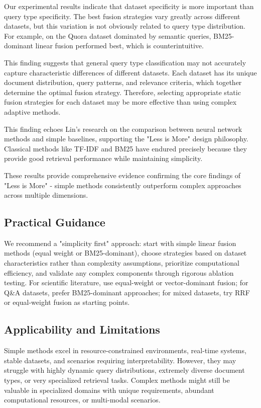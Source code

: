 \documentclass[letterpaper]{article} %
\begin{document}
Our experimental results indicate that dataset specificity is more important than query type specificity. The best fusion strategies vary greatly across different datasets, but this variation is not obviously related to query type distribution. For example, on the Quora dataset dominated by semantic queries, BM25-dominant linear fusion performed best, which is counterintuitive.

This finding suggests that general query type classification may not accurately capture characteristic differences of different datasets. Each dataset has its unique document distribution, query patterns, and relevance criteria, which together determine the optimal fusion strategy. Therefore, selecting appropriate static fusion strategies for each dataset may be more effective than using complex adaptive methods.

This finding echoes Lin's research \cite{lin2019neural} on the comparison between neural network methods and simple baselines, supporting the "Less is More" design philosophy. Classical methods like TF-IDF \cite{salton1988term} and BM25 \cite{robertson2009probabilistic} have endured precisely because they provide good retrieval performance while maintaining simplicity.

These results provide comprehensive evidence confirming the core findings of "Less is More" - simple methods consistently outperform complex approaches across multiple dimensions.

\subsection{Practical Guidance}

We recommend a "simplicity first" approach: start with simple linear fusion methods (equal weight or BM25-dominant), choose strategies based on dataset characteristics rather than complexity assumptions, prioritize computational efficiency, and validate any complex components through rigorous ablation testing. For scientific literature, use equal-weight or vector-dominant fusion; for Q&A datasets, prefer BM25-dominant approaches; for mixed datasets, try RRF or equal-weight fusion as starting points.

\subsection{Applicability and Limitations}

Simple methods excel in resource-constrained environments, real-time systems, stable datasets, and scenarios requiring interpretability. However, they may struggle with highly dynamic query distributions, extremely diverse document types, or very specialized retrieval tasks. Complex methods might still be valuable in specialized domains with unique requirements, abundant computational resources, or multi-modal scenarios.
\end{document}

